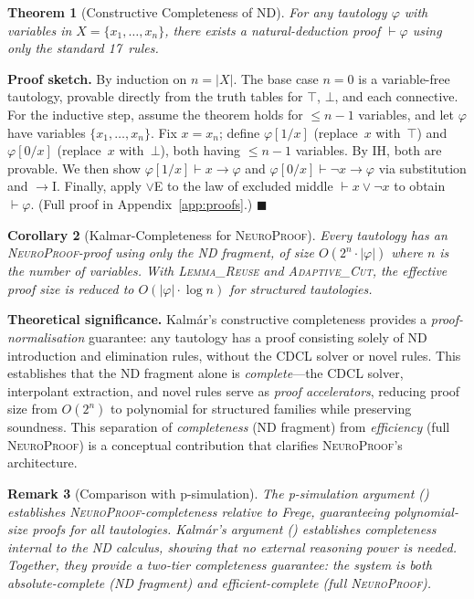 \documentclass[conference]{IEEEtran}
\newtheorem{theorem}{Theorem}[section]
\newtheorem{corollary}[theorem]{Corollary}
\newtheorem{remark}[theorem]{Remark}
\newenvironment{proof}[1][Proof]{\textbf{#1.} }{\hfill$\blacksquare$}
\newcommand{\proves}{\vdash}
\newcommand{\dlor}{\mathbin{\vee}}
\newcommand{\dlnot}{\neg}
\newcommand{\dlimp}{\mathbin{\to}}
\newcommand{\dlbot}{\bot}
\newcommand{\dltop}{\top}
\newcommand{\NP}{\textsc{NeuroProof}}
\begin{document}
\begin{theorem}[Constructive Completeness of ND]
  \label{thm:constructive-completeness}
  For any tautology $\varphi$ with variables in
  $X = \{x_1, \ldots, x_n\}$, there exists a natural-deduction proof
  $\proves \varphi$ using only the standard 17~rules.
\end{theorem}
\begin{proof}[Proof sketch]
  By induction on $n = |X|$.  The base case $n = 0$ is a
  variable-free tautology, provable directly from the truth tables for
  $\dltop$, $\dlbot$, and each connective.  For the inductive step,
  assume the theorem holds for $\le n-1$ variables, and let
  $\varphi$ have variables $\{x_1,\dots,x_n\}$.  Fix
  $x = x_n$; define $\varphi[1/x]$ (replace~$x$ with~$\dltop$) and
  $\varphi[0/x]$ (replace~$x$ with~$\dlbot$), both having
  $\le n-1$ variables.  By IH, both are provable.  We then show
  $\varphi[1/x] \proves x \dlimp \varphi$ and
  $\varphi[0/x] \proves \dlnot x \dlimp \varphi$ via substitution and
  $\to$\textsc{I}.  Finally, apply $\lor$\textsc{E} to the law of
  excluded middle $\proves x \dlor \dlnot x$ to obtain
  $\proves \varphi$.
  (Full proof in Appendix~\ref{app:proofs}.)
\end{proof}

\begin{corollary}[Kalmar-Completeness for \NP{}]
  Every tautology has an \NP{}-proof using only the ND fragment, of
  size $O(2^n \cdot |\varphi|)$ where $n$ is the number of variables.
  With \textsc{Lemma\_Reuse} and \textsc{Adaptive\_Cut}, the
  effective proof size is reduced to $O(|\varphi| \cdot \log n)$ for
  structured tautologies.
\end{corollary}

\medskip
\noindent\textbf{Theoretical significance.}
Kalm\'{a}r's constructive completeness provides a \emph{proof-normalisation}
guarantee: any tautology has a proof consisting solely of ND
introduction and elimination rules, without the CDCL solver or novel
rules.  This establishes that the ND fragment alone is
\emph{complete}---the CDCL solver, interpolant extraction, and novel
rules serve as \emph{proof accelerators}, reducing proof size from
$O(2^n)$ to polynomial for structured families while preserving
soundness.  This separation of \emph{completeness} (ND fragment)
from \emph{efficiency} (full \NP{}) is a conceptual contribution
that clarifies \NP{}'s architecture.

\begin{remark}[Comparison with p-simulation]
  The p-simulation argument () establishes
  \NP{}-completeness relative to Frege, guaranteeing polynomial-size
  proofs for all tautologies.  Kalm\'{a}r's argument
  () establishes completeness
  \emph{internal} to the ND calculus, showing that no external
  reasoning power is needed.  Together, they provide a two-tier
  completeness guarantee: the system is both \emph{absolute-complete}
  (ND fragment) and \emph{efficient-complete} (full \NP{}).
\end{remark}
\end{document}

